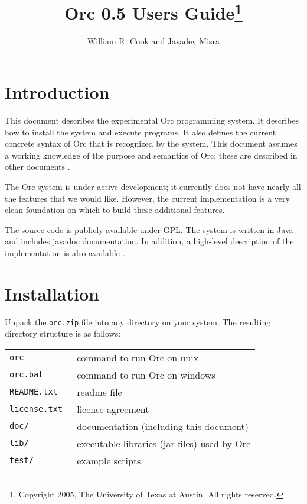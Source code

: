 \documentclass{article}
\begin{document}


\title{Orc 0.5 Users Guide\footnote{Copyright 2005, The University of Texas at Austin. All rights reserved.
}}

\author{William R. Cook and Javadev Misra}

\maketitle




\section{Introduction}
\label{introduction}

This document describes the experimental Orc programming system.
It describes how to install the system and execute programs. 
It also defines the current concrete syntax of Orc
that is recognized by the system. This document assumes
a working knowledge of the purpose and semantics of Orc;
these are described in other documents
\cite{Orc-Marktoberdorf04,Cook-Misra-Orc,Cook-Misra-OrcSem}.

The Orc system is under active development; it currently does not
have nearly all the features that we would like. However, the
current implementation is a very clean foundation on which to build
these additional features.

The source code is publicly available under GPL. The system
is written in Java and includes javadoc documentation. In 
addition, a high-level description of the implementation
is also available \cite{Cook-Misra-OrcImp}.

\section{Installation}
\label{Installation}

Unpack the {\tt orc.zip} file into any directory on your system. 
The resulting directory structure is as follows:

\begin{tabular}{ll}
{\tt orc			} & command to run Orc on unix \\
{\tt orc.bat		} & command to run Orc on windows \\
{\tt README.txt		} & readme file \\
{\tt license.txt	} & license agreement \\
{\tt doc/			} & documentation (including this document) \\
{\tt lib/			} & executable libraries (jar files) used by Orc \\
{\tt test/		    } & example scripts
\end{tabular}
\end{document}
